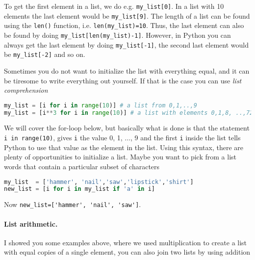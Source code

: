 \documentclass[graybox,sectrefs,envcountresetchap,open=right,final]{svmonodo}
\newenvironment{graybox2admon}[1][]{
\begin{graybox2mdframed}[frametitle=#1]
}
{
\end{graybox2mdframed}
}
\begin{document}
\begin{graybox2admon}[Notice]
To get the first element in a list, we do e.g. \Verb!my_list[0]!. In a list with 10 elements the last element would be \Verb!my_list[9]!. The length of a list can be found using the \texttt{len()} function, i.e. \Verb!len(my_list)=10!. Thus, the last element can also be found by doing \Verb!my_list[len(my_list)-1]!. However, in Python you can always get the last element by doing \Verb!my_list[-1]!, the second last element would be \Verb!my_list[-2]! and so on.
\end{graybox2admon}



Sometimes you do not want to initialize the list with everything equal, and it can be tiresome to write everything out yourself. If that is the case you can use \emph{list comprehension}



\begin{lstlisting}[language=python,style=blue1bar]
my_list = [i for i in range(10)] # a list from 0,1,..,9
my_list = [i**3 for i in range(10)] # a list with elements 0,1,8, ..,729

\end{lstlisting}

We will cover the for-loop below, but basically what is done is that the statement \texttt{i in range(10)}, gives \texttt{i} the value 0, 1, $\ldots$, 9 and the first \texttt{i} inside the list tells Python to use that value as the element in the list. Using this syntax, there are plenty of opportunities to initialize a list. Maybe you want to pick from a list words that contain a particular subset of characters



\begin{lstlisting}[language=python,style=blue1bar]
my_list  = ['hammer', 'nail','saw','lipstick','shirt']
new_list = [i for i in my_list if 'a' in i]

\end{lstlisting}

Now \Verb!new_list=['hammer', 'nail', 'saw']!.

\paragraph{List arithmetic.}
I showed you some examples above, where we used multiplication to create a list with equal copies of a single element, you can also join two lists by using addition
\end{document}
